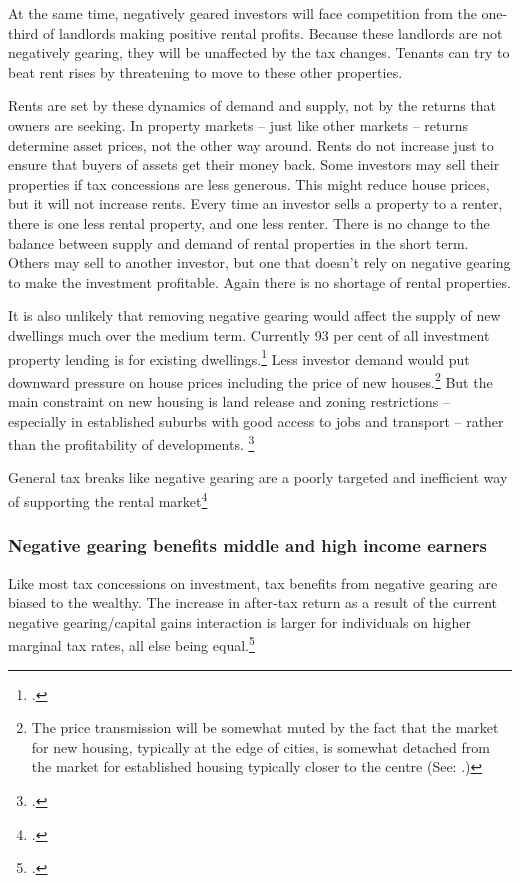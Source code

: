 \documentclass{grattan}\usepackage[]{graphicx}\usepackage[]{color}
\begin{document}
At the same time, negatively geared investors will face competition from the one-third of landlords making positive rental profits. Because these landlords are not negatively gearing, they will be unaffected by the tax changes. Tenants can try to beat rent rises by threatening to move to these other properties.

Rents are set by these dynamics of demand and supply, not by the returns that owners are seeking. In property markets -- just like other markets -- returns determine asset prices, not the other way around. Rents do not increase just to ensure that buyers of assets get their money back.
Some investors may sell their properties if tax concessions are less generous. This might reduce house prices, but it will not increase rents. Every time an investor sells a property to a renter, there is one less rental property, and one less renter. There is no change to the balance between supply and demand of rental properties in the short term. Others may sell to another investor, but one that doesn't rely on negative gearing to make the investment profitable. Again there is no shortage of rental properties.

It is also unlikely that removing negative gearing would affect the supply of new dwellings much over the medium term. Currently 93 per cent of all investment property lending is for existing dwellings.\footcite{ABS2015}  Less investor demand would put downward pressure on house prices including the price of new houses.\footnote{The price transmission will be somewhat muted by the fact that the market for new housing, typically at the edge of cities, is somewhat detached from the market for established housing typically closer to the centre (See: \textcite{Kelly2011}.)}  But the main constraint on new housing is land release and zoning restrictions -- especially in established suburbs with good access to jobs and transport -- rather than the profitability of developments.  \footcites{Kelly2013}[pp.84-90]{Kelly2015}

General tax breaks like negative gearing are a poorly targeted and inefficient way of supporting the rental market\footcite[p.~74]{Treasury2010b}

\subsubsection{Negative gearing benefits middle and high income earners}
Like most tax concessions on investment, tax benefits from negative gearing are biased to the wealthy. The increase in after-tax return as a result of the current negative gearing/capital gains interaction is larger for individuals on higher marginal tax rates, all else being equal.\footcite{Inquiry2014}   
\end{document}
